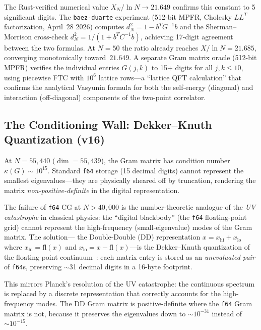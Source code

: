 The Rust-verified numerical value $X_N / \ln N \to 21.649$ confirms
this constant to 5 significant digits.  The \texttt{baez-duarte}
experiment (512-bit MPFR, Cholesky $LL^T$ factorization, April~28 2026)
computes $d_N^2 = 1 - b^T G^{-1} b$ and the Sherman--Morrison
cross-check $d_N^2 = 1/(1 + b^T C^{-1} b)$, achieving 17-digit
agreement between the two formulas.  At $N = 50$ the ratio already
reaches $X/\ln N = 21.685$, converging monotonically toward~$21.649$.
A separate Gram matrix oracle (512-bit MPFR) verifies the individual
entries $G(j,k)$ to 15+ digits for all $j, k \leq 10$, using
piecewise FTC with $10^6$ lattice rows---a ``lattice QFT
calculation'' that confirms the analytical Vasyunin formula
for both the self-energy (diagonal) and interaction (off-diagonal)
components of the two-point correlator.

\subsection{The Conditioning Wall: Dekker--Knuth Quantization (v16)}
\label{sec:dd-precision}

At $N = 55{,}440$ ($\dim = 55{,}439$), the Gram matrix has condition number
$\kappa(G) \sim 10^{15}$. Standard \texttt{f64} storage (15 decimal digits)
cannot represent the smallest eigenvalues---they are physically sheared off
by truncation, rendering the matrix \emph{non-positive-definite} in the
digital representation.

\begin{principle}
The failure of \texttt{f64} CG at $N > 40{,}000$ is the number-theoretic
analogue of the \emph{UV catastrophe} in classical physics: the ``digital
blackbody'' (the \texttt{f64} floating-point grid) cannot represent the
high-frequency (small-eigenvalue) modes of the Gram matrix. The solution---
the Double-Double (DD) representation $x = x_{\mathrm{hi}} + x_{\mathrm{lo}}$
where $x_{\mathrm{hi}} = \mathrm{fl}(x)$ and
$x_{\mathrm{lo}} = x - \mathrm{fl}(x)$---is the Dekker--Knuth quantization
of the floating-point continuum~\cite{dekker1971,knuth1997}: each matrix
entry is stored as an \emph{unevaluated pair} of \texttt{f64}s, preserving
$\sim$31 decimal digits in a 16-byte footprint.

This mirrors Planck's resolution of the UV catastrophe: the continuous
spectrum is replaced by a discrete representation that correctly accounts
for the high-frequency modes. The DD Gram matrix is positive-definite where
the \texttt{f64} Gram matrix is not, because it preserves the eigenvalues
down to $\sim 10^{-31}$ instead of $\sim 10^{-15}$.
\end{principle}

